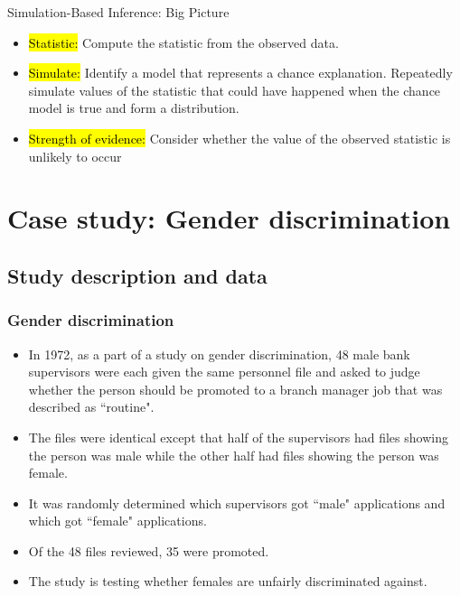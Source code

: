 \documentclass[slidestop,compress,mathserif]{beamer}
\newcommand{\soln}[1]{\textit{#1}}
\begin{document}

\begin{frame}{Simulation-Based Inference: Big Picture}
    \begin{itemize}
        \item \hl{Statistic: }Compute the statistic from the observed data.
        \item \hl{Simulate: } Identify a model that represents a chance explanation. Repeatedly simulate 
        values of the statistic that could have happened when the chance model is true and form a distribution. 
        \item \hl{Strength of evidence: }Consider whether the value of the observed statistic is unlikely to occur
    \end{itemize}
\end{frame}


\section{Case study: Gender discrimination}


\subsection{Study description and data}


\begin{frame}
\frametitle{Gender discrimination}

\begin{itemize}

\item In 1972, as a part of a study on gender discrimination, 48 male bank supervisors were each given the same personnel file and asked to judge whether the person should be promoted to a branch manager job that was described as ``routine". 

\item The files were identical except that half of the supervisors had files showing the person was male while the other half had files showing the person was female.

\item It was randomly determined which supervisors got ``male" applications and which got ``female" applications.  

\item Of the 48 files reviewed, 35 were promoted. 

\item The study is testing whether females are unfairly discriminated against.  
\end{itemize}

 \soln{}


\end{frame}
\end{document}
